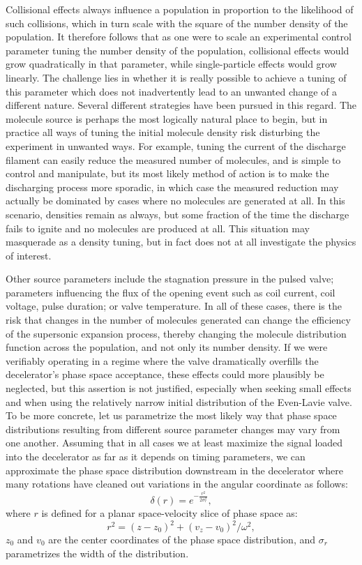 Collisional effects always influence a population in proportion to the likelihood of such collisions, which in turn scale with the square of the number density of the population.
It therefore follows that as one were to scale an experimental control parameter tuning the number density of the population, collisional effects would grow quadratically in that parameter, while single-particle effects would grow linearly.
The challenge lies in whether it is really possible to achieve a tuning of this parameter which does not inadvertently lead to an unwanted change of a different nature.
Several different strategies have been pursued in this regard.
The molecule source is perhaps the most logically natural place to begin, but in practice all ways of tuning the initial molecule density risk disturbing the experiment in unwanted ways.
For example, tuning the current of the discharge filament can easily reduce the measured number of molecules, and is simple to control and manipulate, but its most likely method of action is to make the discharging process more sporadic, in which case the measured reduction may actually be dominated by cases where no molecules are generated at all.
In this scenario, densities remain as always, but some fraction of the time the discharge fails to ignite and no molecules are produced at all.
This situation may masquerade as a density tuning, but in fact does not at all investigate the physics of interest.

Other source parameters include the stagnation pressure in the pulsed valve; parameters influencing the flux of the opening event such as coil current, coil voltage, pulse duration; or valve temperature.
In all of these cases, there is the risk that changes in the number of molecules generated can change the efficiency of the supersonic expansion process, thereby changing the molecule distribution function across the population, and not only its number density.
If we were verifiably operating in a regime where the valve dramatically overfills the decelerator's phase space acceptance, these effects could more plausibly be neglected, but this assertion is not justified, especially when seeking small effects and when using the relatively narrow initial distribution of the Even-Lavie valve.
To be more concrete, let us parametrize the most likely way that phase space distributions resulting from different source parameter changes may vary from one another.
Assuming that in all cases we at least maximize the signal loaded into the decelerator as far as it depends on timing parameters, we can approximate the phase space distribution downstream in the decelerator where many rotations have cleaned out variations in the angular coordinate as follows:
\begin{equation}
\delta(r) = e^{-\frac{r^2}{2\sigma_r^2}},\label{eqbaddist}
\end{equation}
where $r$ is defined for a planar space-velocity slice of phase space as:
\begin{equation}
r^2 = (z-z_0)^2 + (v_z-v_0)^2/\omega^2,
\end{equation}
$z_0$ and $v_0$ are the center coordinates of the phase space distribution, and $\sigma_r$ parametrizes the width of the distribution.

